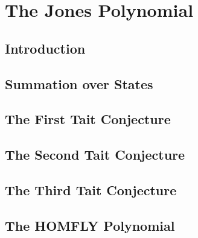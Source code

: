 \chapter{The Jones Polynomial}

\section{Introduction}

\section{Summation over States}

\section{The First Tait Conjecture}

\section{The Second Tait Conjecture}

\section{The Third Tait Conjecture}

\section{The HOMFLY Polynomial}
